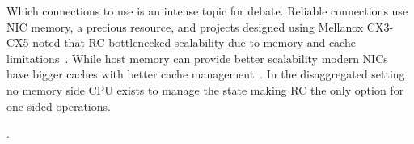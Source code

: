 Which connections to use is an intense topic for debate.
Reliable connections use NIC memory, a precious resource,
and projects designed using Mellanox CX3-CX5 noted that RC
bottlenecked scalability due to memory and cache
limitations~\cite{farm,faast,erpc,litem,design-guidelines}.
While host memory can provide better scalability modern NICs
have bigger caches with better cache
management~\cite{storm}. In the disaggregated setting no
memory side CPU exists to manage the state making RC the
only option for one sided operations.



.



